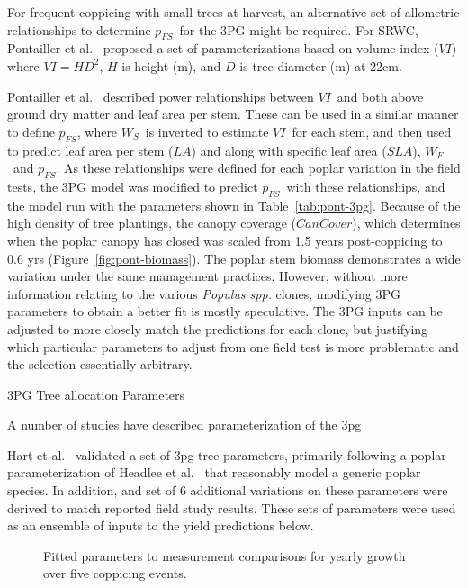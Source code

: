 \documentclass[preprint,12pt]{elsarticle}
\newcommand{\pop}{\textit{Populus spp.} }
\newcommand{\SLA}{\ensuremath{SLA}}
\newcommand{\WF}{\ensuremath{W_F}}
\newcommand{\WS}{\ensuremath{W_S}}
\newcommand{\pfs}{\ensuremath{p_{FS}}}
\newcommand{\VI}{\ensuremath{VI}}
\newcommand{\cancover}{\ensuremath{CanCover}}
\newcommand{\LA}{\ensuremath{LA}}
\begin{document}
For frequent coppicing with small trees at harvest, an alternative set of
allometric relationships to determine \pfs~for the 3PG might be required. For
\ac{SRWC}, Pontailler et al.~\cite{pontailler97-volume-index} proposed a set of
parameterizations based on volume index (\VI) where $VI = HD^2$, $H$ is height
(m), and $D$ is tree diameter (m) at 22cm.

Pontailler et al.~\cite{pontailler97-volume-index} described power relationships
between \VI~and both above ground dry matter and leaf area per stem. These can
be used in a similar manner to define \pfs, where \WS~is inverted to estimate
\VI~for each stem, and then used to predict leaf area per stem (\LA) and along
with specific leaf area (\SLA), \WF~and \pfs. As these relationships were
defined for each poplar variation in the field tests, the 3PG model was modified
to predict \pfs~with these relationships, and the model run with the parameters
shown in Table~\ref{tab:pont-3pg}.  Because of the high density of tree
plantings, the canopy coverage (\cancover), which determines when the poplar
canopy has closed was scaled from 1.5 years post-coppicing to 0.6 yrs
(Figure~\ref{fig:pont-biomass}). The poplar stem biomass demonstrates a wide
variation under the same management practices. However, without more information
relating to the various \pop clones, modifying 3PG parameters to obtain a better
fit is mostly speculative. The 3PG inputs can be adjusted to more closely match
the predictions for each clone, but justifying which particular parameters to
adjust from one field test is more problematic and the selection essentially
arbitrary.

\begin{table}%
\caption{3PG Tree allocation Parameters}

\label{tab:3pg-tree-allocate}
\end{table}

A number of studies have described parameterization of the \ac{3pg}

Hart et al.~\cite{Hart2014} validated a set of \ac{3pg} tree
parameters, primarily following a poplar parameterization of Headlee
et al.~\cite{Headlee2012} that reasonably model a generic poplar
species.  In addition, and set of 6 additional variations on these
parameters were derived to match reported field study results.  These
sets of parameters were used as an ensemble of inputs to the yield
predictions below.


\begin{figure}%
  \centering
  
  \caption{Fitted parameters to measurement comparisons for yearly growth
      over five coppicing events.}
\label{fig:pont-best}
\end{figure}
\end{document}
